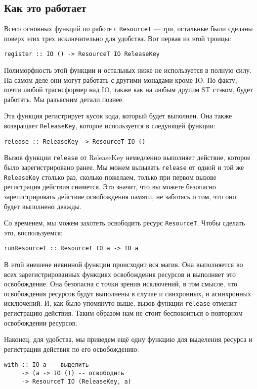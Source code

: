 \subsection{Как это работает}
Всего основных функций по работе с \lstinline'ResourceT' --- три, остальные были
сделаны поверх этих трех исключительно для удобства. Вот первая из этой троицы:
\begin{lstlisting}
register :: IO () -> ResourceT IO ReleaseKey
\end{lstlisting}
\begin{remark}
Полиморфность этой функции и остальных ниже не используется в полную силу. На самом деле
они могут работать с другими монадами кроме IO. По факту, почти любой траснсформер над
IO, также как на любым другим ST стэком, будет работать. Мы разъясним детали познее.
\end{remark}
Эта функция регистрирует кусок кода, который будет выполнен. Она также
возвращает \lstinline'ReleaseKey', которое используется в следующей функции:

\begin{lstlisting}
release :: ReleaseKey -> ResourceT IO ()
\end{lstlisting}
Вызов функции \verb=release= от ReleaseKey немедленно выполняет действие, которое было
зарегистрировано ранее. Мы можем вызывать \verb=release= от одной и той же
\lstinline'ReleaseKey'
столько раз, сколько пожелаем, только при первом вызове регистрация действия снимется. Это
значит, что вы можете безопасно зарегистрировать действие освобождения памяти, не
заботясь о том, что оно будет выполнено дважды.

Со временем, мы можем захотеть освободить ресурс \lstinline'ResourceT'. Чтобы сделать это,
воспользуемся:
\begin{lstlisting}
runResourceT :: ResourceT IO a -> IO a
\end{lstlisting}
В этой внешене невинной функции происходит вся магия. Она выполняется во всех
зарегистрированных функциях освобождения ресурсов и выполняет это освобождение. 
Она безопасна с точки зрения исключений, в
том смысле, что освобождения ресурсов будут выполнены в случае и синхронных, и
асинхронных исключений. И, как было упомянуто выше, вызов функции \lstinline'release'
отменит
регистрацию действия. Таким образом нам не стоит беспокоиться о повторном освобождении
ресурсов.

Наконец, для удобства, мы приведем ещё одну функцию для выделения ресурса и регистрации
действия по его освобождению:
\begin{lstlisting}
with :: IO a -- выделить
     -> (a -> IO ()) -- освободить
     -> ResourceT IO (ReleaseKey, a)
\end{lstlisting}


